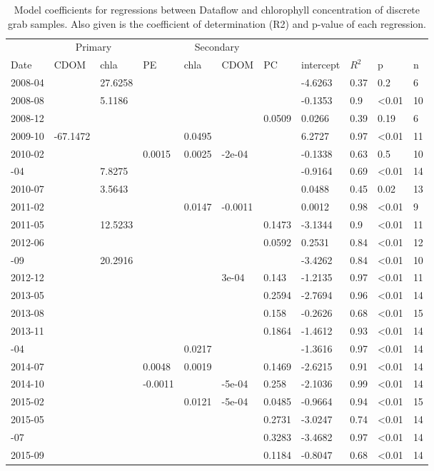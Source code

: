 \begin{table}

\caption{\label{tab:}Model coefficients for regressions between Dataflow and chlorophyll concentration of discrete grab samples. Also given is the coefficient of determination (R2) and p-value of each regression.}
\centering
\begin{tabular}[t]{lllllllllll}
\toprule
\multicolumn{1}{c}{ } & \multicolumn{2}{c}{Primary} & \multicolumn{4}{c}{Secondary} \\ \cmidrule(l{2pt}r{2pt}){2-3} \cmidrule(l{2pt}r{2pt}){4-7}
Date & CDOM & chla & PE & chla & CDOM & PC & intercept & $R^2$ & p & n\\
\midrule
2008-04 &  & 27.6258 &  &  &  &  & -4.6263 & 0.37 & 0.2 & 6\\
2008-08 &  & 5.1186 &  &  &  &  & -0.1353 & 0.9 & \textless0.01 & 10\\
2008-12 &  &  &  &  &  & 0.0509 & 0.0266 & 0.39 & 0.19 & 6\\
2009-10 & -67.1472 &  &  & 0.0495 &  &  & 6.2727 & 0.97 & \textless0.01 & 11\\
2010-02 &  &  & 0.0015 & 0.0025 & -2e-04 &  & -0.1338 & 0.63 & 0.5 & 10\\
\addlinespace
2010-04 &  & 7.8275 &  &  &  &  & -0.9164 & 0.69 & \textless0.01 & 14\\
2010-07 &  & 3.5643 &  &  &  &  & 0.0488 & 0.45 & 0.02 & 13\\
2011-02 &  &  &  & 0.0147 & -0.0011 &  & 0.0012 & 0.98 & \textless0.01 & 9\\
2011-05 &  & 12.5233 &  &  &  & 0.1473 & -3.1344 & 0.9 & \textless0.01 & 11\\
2012-06 &  &  &  &  &  & 0.0592 & 0.2531 & 0.84 & \textless0.01 & 12\\
\addlinespace
2012-09 &  & 20.2916 &  &  &  &  & -3.4262 & 0.84 & \textless0.01 & 10\\
2012-12 &  &  &  &  & 3e-04 & 0.143 & -1.2135 & 0.97 & \textless0.01 & 11\\
2013-05 &  &  &  &  &  & 0.2594 & -2.7694 & 0.96 & \textless0.01 & 14\\
2013-08 &  &  &  &  &  & 0.158 & -0.2626 & 0.68 & \textless0.01 & 15\\
2013-11 &  &  &  &  &  & 0.1864 & -1.4612 & 0.93 & \textless0.01 & 14\\
\addlinespace
2014-04 &  &  &  & 0.0217 &  &  & -1.3616 & 0.97 & \textless0.01 & 14\\
2014-07 &  &  & 0.0048 & 0.0019 &  & 0.1469 & -2.6215 & 0.91 & \textless0.01 & 14\\
2014-10 &  &  & -0.0011 &  & -5e-04 & 0.258 & -2.1036 & 0.99 & \textless0.01 & 14\\
2015-02 &  &  &  & 0.0121 & -5e-04 & 0.0485 & -0.9664 & 0.94 & \textless0.01 & 15\\
2015-05 &  &  &  &  &  & 0.2731 & -3.0247 & 0.74 & \textless0.01 & 14\\
\addlinespace
2015-07 &  &  &  &  &  & 0.3283 & -3.4682 & 0.97 & \textless0.01 & 14\\
2015-09 &  &  &  &  &  & 0.1184 & -0.8047 & 0.68 & \textless0.01 & 14\\
\bottomrule
\end{tabular}
\end{table}
